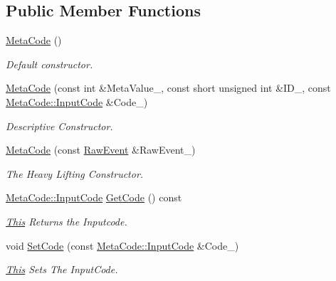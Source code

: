 \subsection*{Public Member Functions}
\begin{DoxyCompactItemize}
\item 
\hyperlink{classphys_1_1MetaCode_ae2c80c84f924ddfd880f46ffe6a1746e}{MetaCode} ()
\begin{DoxyCompactList}\small\item\em Default constructor. \item\end{DoxyCompactList}\item 
\hyperlink{classphys_1_1MetaCode_a05bcc50a09a9a5d19520dc258841f117}{MetaCode} (const int \&MetaValue\_\-, const short unsigned int \&ID\_\-, const \hyperlink{classphys_1_1MetaCode_a3e501cbb5bf0f6f1fdb7211465bda8d8}{MetaCode::InputCode} \&Code\_\-)
\begin{DoxyCompactList}\small\item\em Descriptive Constructor. \item\end{DoxyCompactList}\item 
\hyperlink{classphys_1_1MetaCode_ad9a618b5cc6f9d0cf0a4bc4f47bf98e8}{MetaCode} (const \hyperlink{namespacephys_a8126d26e4507e66d09876988bb941fd4}{RawEvent} \&RawEvent\_\-)
\begin{DoxyCompactList}\small\item\em The Heavy Lifting Constructor. \item\end{DoxyCompactList}\item 
\hyperlink{classphys_1_1MetaCode_a3e501cbb5bf0f6f1fdb7211465bda8d8}{MetaCode::InputCode} \hyperlink{classphys_1_1MetaCode_a5835a05391cbb5a3dc83534a7bcf87d3}{GetCode} () const 
\begin{DoxyCompactList}\small\item\em \hyperlink{structThis}{This} Returns the Inputcode. \item\end{DoxyCompactList}\item 
void \hyperlink{classphys_1_1MetaCode_ab6759fbee9d039cf248bf76dde0f33dd}{SetCode} (const \hyperlink{classphys_1_1MetaCode_a3e501cbb5bf0f6f1fdb7211465bda8d8}{MetaCode::InputCode} \&Code\_\-)
\begin{DoxyCompactList}\small\item\em \hyperlink{structThis}{This} Sets The InputCode. \item\end{DoxyCompactList}\item 

\end{DoxyCompactItemize}
